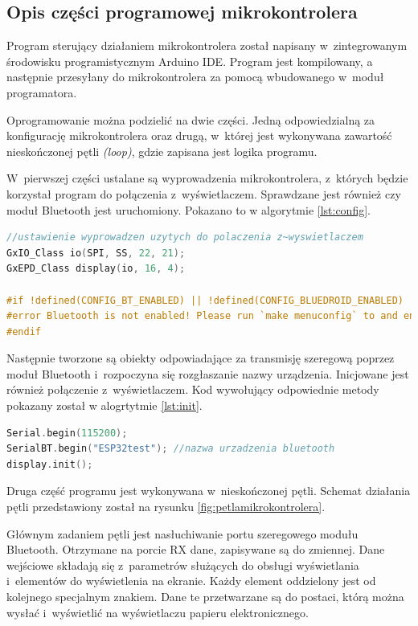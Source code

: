 \documentclass[a4paper,12pt, twoside]{article}
\begin{document}
        \subsection{Opis części programowej mikrokontrolera}
    	Program sterujący działaniem mikrokontrolera został napisany w~zintegrowanym środowisku programistycznym Arduino IDE. Program jest kompilowany, a następnie przesyłany do mikrokontrolera za pomocą wbudowanego w~moduł programatora.

        Oprogramowanie można podzielić na dwie części. Jedną odpowiedzialną za konfigurację mikrokontrolera oraz drugą, w~której jest wykonywana zawartość nieskończonej pętli \textit{(loop)}, gdzie zapisana jest logika programu.
        
        W~pierwszej części ustalane są wyprowadzenia mikrokontrolera, z~których będzie korzystał program do połączenia z~wyświetlaczem. Sprawdzane jest również czy moduł Bluetooth jest uruchomiony. Pokazano to w algorytmie \ref{lst:config}.
        \begin{lstlisting}[language=C++, caption=Konfiguracja wykorzystanych modułów, label={lst:config}]
//ustawienie wyprowadzen uzytych do polaczenia z~wyswietlaczem
GxIO_Class io(SPI, SS, 22, 21);
GxEPD_Class display(io, 16, 4);

#if !defined(CONFIG_BT_ENABLED) || !defined(CONFIG_BLUEDROID_ENABLED)
#error Bluetooth is not enabled! Please run `make menuconfig` to and enable it
#endif
\end{lstlisting}

        Następnie tworzone są obiekty odpowiadające za transmisję szeregową poprzez moduł Bluetooth i~rozpoczyna się rozgłaszanie nazwy urządzenia. Inicjowane jest również połączenie z~wyświetlaczem. Kod wywołujący odpowiednie metody pokazany został w  alogrtytmie \ref{lst:init}.
        \begin{lstlisting}[language=C++, caption=Inicjalizacja wyświetlacza i transmisji szeregowej, label={lst:init}]
Serial.begin(115200);
SerialBT.begin("ESP32test"); //nazwa urzadzenia bluetooth
display.init();
\end{lstlisting}

    	Druga część programu jest wykonywana w~nieskończonej pętli. Schemat działania pętli przedstawiony został na rysunku \ref{fig:petlamikrokontrolera}.
    	
    	Głównym zadaniem pętli jest nasłuchiwanie portu szeregowego modułu Bluetooth. Otrzymane na porcie RX dane, zapisywane są do zmiennej. Dane wejściowe składają się z~parametrów służących do obsługi wyświetlania i~elementów do wyświetlenia na ekranie. Każdy element oddzielony jest od kolejnego specjalnym znakiem. Dane te przetwarzane są do postaci, którą można wysłać i~wyświetlić na wyświetlaczu papieru elektronicznego. 
    	
\end{document}

